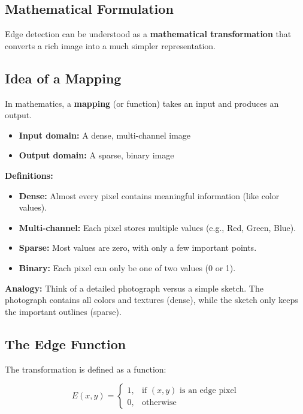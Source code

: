 \documentclass[12pt]{article}
\begin{document}
\subsection{Mathematical Formulation}
Edge detection can be understood as a \textbf{mathematical transformation} that converts a rich image into a much simpler representation.

\subsection{Idea of a Mapping}

In mathematics, a \textbf{mapping} (or function) takes an input and produces an output.

\begin{itemize}
    \item \textbf{Input domain:} A dense, multi-channel image
    \item \textbf{Output domain:} A sparse, binary image
\end{itemize}

\textbf{Definitions:}
\begin{itemize}
    \item \textbf{Dense:} Almost every pixel contains meaningful information (like color values).
    \item \textbf{Multi-channel:} Each pixel stores multiple values (e.g., Red, Green, Blue).
    \item \textbf{Sparse:} Most values are zero, with only a few important points.
    \item \textbf{Binary:} Each pixel can only be one of two values (0 or 1).
\end{itemize}

\textbf{Analogy:}
Think of a detailed photograph versus a simple sketch. The photograph contains all colors and textures (dense), while the sketch only keeps the important outlines (sparse).

\subsection{The Edge Function}

The transformation is defined as a function:

\[
    E(x,y) =
    \begin{cases}
        1, & \text{if } (x,y) \text{ is an edge pixel} \\
        0, & \text{otherwise}
    \end{cases}
\]
\end{document}
